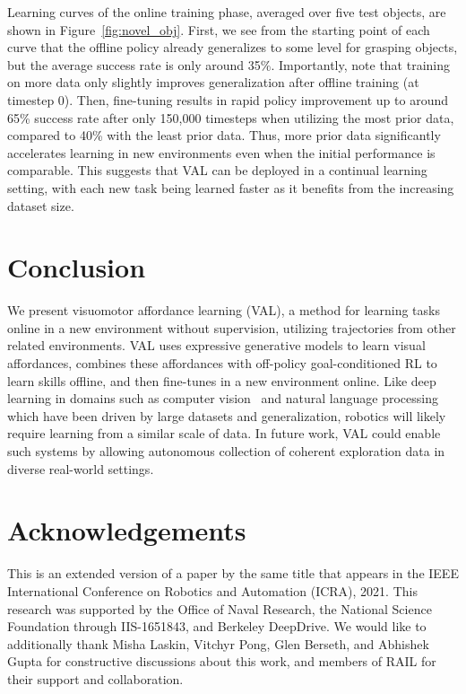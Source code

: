 \documentclass[letterpaper, 10 pt, conference]{ieeeconf}  %
\begin{document}
Learning curves of the online training phase, averaged over five test objects, are shown in Figure~\ref{fig:novel_obj}. 
First, we see from the starting point of each curve that the offline policy already generalizes to some level for grasping objects, but the average success rate is only around 35\%. 
Importantly, note that training on more data only slightly improves generalization after offline training (at timestep 0).
Then, fine-tuning results in rapid policy improvement up to around 65\% success rate after only 150,000 timesteps when utilizing the most prior data, compared to 40\% with the least prior data.
Thus, more prior data significantly accelerates learning in new environments even when the initial performance is comparable.
This suggests that VAL can be deployed in a continual learning setting, with each new task being learned faster as it benefits from the increasing dataset size.



\section{Conclusion}
\label{sec:conclusion}

We present visuomotor affordance learning (VAL), a method for learning tasks online in a new environment without supervision, utilizing trajectories from other related environments. VAL uses expressive generative models to learn visual affordances, combines these affordances with off-policy goal-conditioned RL to learn skills offline, and then fine-tunes in a new environment online. Like deep learning in domains such as computer vision~\cite{krizhevsky2012imagenet} and natural language processing~\cite{devlin2019bert} which have been driven by large datasets and generalization, robotics will likely require learning from a similar scale of data. In future work, VAL could enable such systems by allowing autonomous collection of coherent exploration data in diverse real-world settings.

\section{Acknowledgements}

This is an extended version of a paper by the same title that appears in the IEEE International Conference on Robotics and Automation (ICRA), 2021. This research was supported by the Office of Naval Research, the National Science Foundation through IIS-1651843, and Berkeley DeepDrive. We would like to additionally thank Misha Laskin, Vitchyr Pong, Glen Berseth, and Abhishek Gupta for constructive discussions about this work, and members of RAIL for their support and collaboration.
\end{document}
